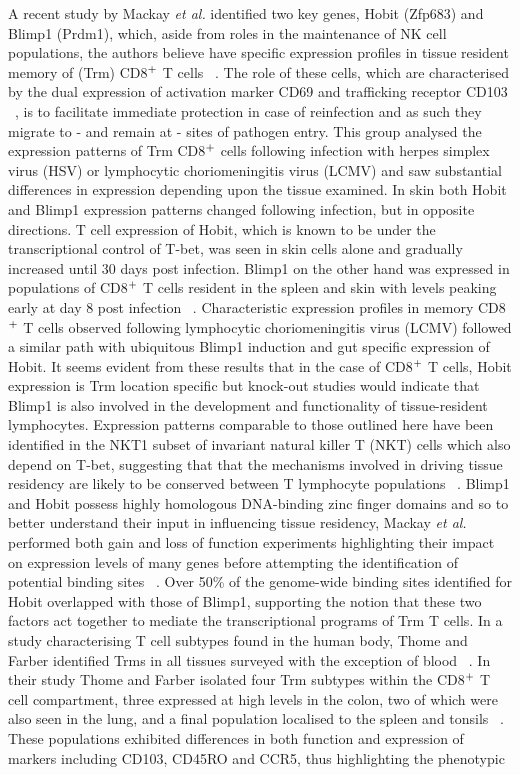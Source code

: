 A recent study by Mackay \textit{et al.} identified two key genes, Hobit (Zfp683) and Blimp1 (Prdm1), which, aside from roles in the maintenance of NK cell populations, the authors believe have specific expression profiles in tissue resident memory of (Trm) CD8$\textsuperscript{+}$ T cells ~\autocite{Mac2016}. The role of these cells, which are characterised by the dual expression of activation marker CD69 and trafficking receptor CD103 ~\autocite{Tho2015}, is to facilitate immediate protection in case of reinfection and as such they migrate to - and remain at - sites of pathogen entry. This group analysed the expression patterns of Trm CD8$\textsuperscript{+}$ cells following infection with herpes simplex virus (HSV) or lymphocytic choriomeningitis virus (LCMV) and saw substantial differences in expression depending upon the tissue examined. In skin both Hobit and Blimp1 expression patterns changed following infection, but in opposite directions. T cell expression of Hobit, which is known to be under the transcriptional control of T-bet, was seen in skin cells alone and gradually increased until 30 days post infection. Blimp1 on the other hand was expressed in populations of CD8$\textsuperscript{+}$ T cells resident in the spleen and skin with levels peaking early at day 8 post infection ~\autocite{Mac2016}. Characteristic expression profiles in memory CD8$\textsuperscript{+}$ T cells observed following lymphocytic choriomeningitis virus (LCMV) followed a similar path with ubiquitous Blimp1 induction and gut specific expression of Hobit. It seems evident from these results that in the case of CD8$\textsuperscript{+}$ T cells, Hobit expression is Trm location specific but knock-out studies would indicate that Blimp1 is also involved in the development and functionality of tissue-resident lymphocytes. Expression patterns comparable to those outlined here have been identified in the NKT1 subset of invariant natural killer T (NKT) cells which also depend on T-bet, suggesting that  that the mechanisms involved in driving tissue residency are likely to be conserved between T lymphocyte populations ~\autocite{Mac2016}. Blimp1 and Hobit possess highly homologous DNA-binding zinc finger domains and so to better understand their input in influencing tissue residency, Mackay \textit{et al.} performed both gain and loss of function experiments highlighting their impact on expression levels of many genes before attempting the identification of potential binding sites ~\autocite{Mac2016}. Over 50\% of the genome-wide binding sites identified for Hobit overlapped with those of Blimp1, supporting the notion that these two factors act together to mediate the transcriptional programs of Trm T cells. In a study characterising T cell subtypes found in the human body, Thome and Farber identified Trms in all tissues surveyed with the exception of blood ~\autocite{Tho2015}. In their study Thome and Farber isolated four Trm subtypes within the CD8$\textsuperscript{+}$ T cell compartment, three expressed at high levels in the colon, two of which were also seen in the lung, and a final population localised to the spleen and tonsils ~\autocite{Tho2015}. These populations exhibited differences in both function and expression of markers including CD103, CD45RO and CCR5, thus highlighting the phenotypic 